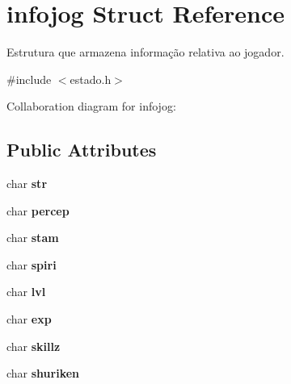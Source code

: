 \hypertarget{structinfojog}{}\section{infojog Struct Reference}
\label{structinfojog}


Estrutura que armazena informação relativa ao jogador.  




{\ttfamily \#include $<$estado.\+h$>$}



Collaboration diagram for infojog\+:
\subsection*{Public Attributes}
\begin{DoxyCompactItemize}
\item 
char {\bfseries str}\hypertarget{structinfojog_a1963321d2817386d163855052ecfafd6}{}\label{structinfojog_a1963321d2817386d163855052ecfafd6}

\item 
char {\bfseries percep}\hypertarget{structinfojog_abeb5eefe3bd13fdcf09ce5f8fe2ca204}{}\label{structinfojog_abeb5eefe3bd13fdcf09ce5f8fe2ca204}

\item 
char {\bfseries stam}\hypertarget{structinfojog_a424398d6d3247e2ab72ea8d479f9095d}{}\label{structinfojog_a424398d6d3247e2ab72ea8d479f9095d}

\item 
char {\bfseries spiri}\hypertarget{structinfojog_aef86a5fc55e2b76b8c7f17dd938af742}{}\label{structinfojog_aef86a5fc55e2b76b8c7f17dd938af742}

\item 
char {\bfseries lvl}\hypertarget{structinfojog_a55614f5e0cb6d9a2d02739c5beb7d433}{}\label{structinfojog_a55614f5e0cb6d9a2d02739c5beb7d433}

\item 
char {\bfseries exp}\hypertarget{structinfojog_ae72c8c30e3372155f0676c25ebd4fb0a}{}\label{structinfojog_ae72c8c30e3372155f0676c25ebd4fb0a}

\item 
char {\bfseries skillz}\hypertarget{structinfojog_a2ee3515a3df2def268a5cea99a391ed8}{}\label{structinfojog_a2ee3515a3df2def268a5cea99a391ed8}

\item 
char {\bfseries shuriken}\hypertarget{structinfojog_a56e679415202ada78f0c72c5709efb57}{}\label{structinfojog_a56e679415202ada78f0c72c5709efb57}


\end{DoxyCompactItemize}
